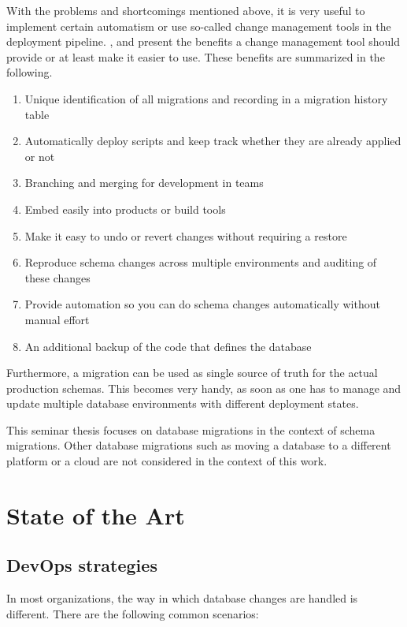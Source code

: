  
%
With the problems and shortcomings mentioned above, it is very useful to implement certain automatism or use so-called change management tools in the deployment pipeline.
\cite{Dillon2022}, \cite{Robles2021} and \cite{Fritchey2022} present the benefits a change management tool should provide or at least make it easier to use. These benefits are summarized in the following.

\begin{enumerate}
	\item Unique identification of all migrations and recording in a migration history table
    \item Automatically deploy scripts and keep track whether they are already applied or not
    \item Branching and merging for development in teams
    \item Embed easily into products or build tools
    \item Make it easy to undo or revert changes without requiring a restore
    \item Reproduce schema changes across multiple environments and auditing of these changes
    \item Provide automation so you can do schema changes automatically without manual effort
    \item An additional backup of the code that defines the database
\end{enumerate}


Furthermore, a migration can be used as single source of truth for the actual production schemas. This becomes very handy, as soon as one has to manage and update multiple database environments with different deployment states.

%
This seminar thesis focuses on database migrations in the context of schema migrations.  Other database migrations such as moving a database to a different platform or a cloud are not considered in the context of this work.

\section{State of the Art}%
\subsection{DevOps strategies}
%
In most organizations, the way in which database changes are handled is different. There are the following common scenarios:

